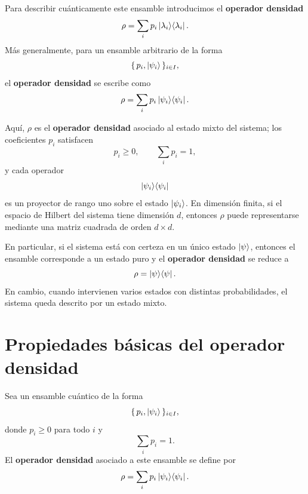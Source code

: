 \documentclass[../main.tex]{subfiles}
\begin{document}
Para describir cuánticamente este ensamble introducimos el \textbf{operador densidad}
\begin{equation*}
    \rho = \sum_i p_i \ket{\lambda_i}\!\bra{\lambda_i}.
\end{equation*}
Más generalmente, para un ensamble arbitrario de la forma
\begin{equation*}
    \{\,p_i,\ket{\psi_i}\,\}_{i\in I},
\end{equation*}
el \textbf{operador densidad} se escribe como
\begin{equation*}
    \rho = \sum_i p_i \ket{\psi_i}\!\bra{\psi_i}.
\end{equation*}

Aquí, $\rho$ es el \textbf{operador densidad} asociado al estado mixto del sistema; los coeficientes $p_i$ satisfacen
\begin{equation*}
    p_i \ge 0,
    \qquad
    \sum_i p_i = 1,
\end{equation*}
y cada operador
\begin{equation*}
    \ket{\psi_i}\!\bra{\psi_i}
\end{equation*}
es un proyector de rango uno sobre el estado $\ket{\psi_i}$. En dimensión finita, si el espacio de Hilbert del sistema tiene dimensión $d$, entonces $\rho$ puede representarse mediante una matriz cuadrada de orden $d\times d$.

En particular, si el sistema está con certeza en un único estado $\ket{\psi}$, entonces el ensamble corresponde a un estado puro y el \textbf{operador densidad} se reduce a
\begin{equation*}
    \rho = \ket{\psi}\!\bra{\psi}.
\end{equation*}
En cambio, cuando intervienen varios estados con distintas probabilidades, el sistema queda descrito por un estado mixto. 


\section{Propiedades básicas del \textbf{operador densidad}}

Sea un ensamble cuántico de la forma
\begin{equation*}
    \{\,p_i,\ket{\psi_i}\,\}_{i\in I},
\end{equation*}
donde $p_i\geq 0$ para todo $i$ y
\begin{equation*}
    \sum_i p_i = 1.
\end{equation*}
El \textbf{operador densidad} asociado a este ensamble se define por
\begin{equation*}
    \rho = \sum_i p_i \ket{\psi_i}\!\bra{\psi_i}.
\end{equation*}
\end{document}
